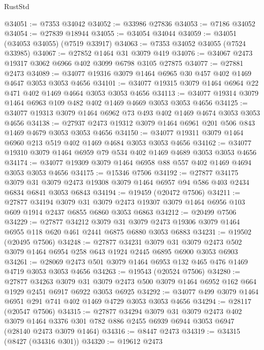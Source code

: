 \begin{lexlean}{RustStd}
\begin{coremodule}
@34051 := @7353 @34042
@34052 := @33986 @27836
@34053 := @7186 @34052
@34054 := @27839 @18944
@34055 := @34054 @34044
@34059 := @34051 (@34053 @34055) (@7519 @33917)
@34063 := @7353 @34052 @34055 (@7524 @33985)
@34067 := @27852 @1464 @31 @3079 @419
@34076 := @34067 @2473 @19317 @3062 @6966 @402 @3099 @6798 @3105 @27875
@34077 := @27881 @2473
@34089 := @34077 @19316 @3079 @1464 @6965 @30 @457 @402 @1469 @4647 @3053 @3053 @4656
@34101 := @34077 @19315 @3079 @1464 @6964 @22 @471 @402 @1469 @4664 @3053 @3053 @4656
@34113 := @34077 @19314 @3079 @1464 @6963 @109 @482 @402 @1469 @4669 @3053 @3053 @4656
@34125 := @34077 @19313 @3079 @1464 @6962 @73 @493 @402 @1469 @4674 @3053 @3053 @4656
@34138 := @27937 @2473 @19312 @3079 @1464 @6961 @201 @506 @843 @1469 @4679 @3053 @3053 @4656
@34150 := @34077 @19311 @3079 @1464 @6960 @213 @519 @402 @1469 @4684 @3053 @3053 @4656
@34162 := @34077 @19310 @3079 @1464 @6959 @79 @534 @402 @1469 @4689 @3053 @3053 @4656
@34174 := @34077 @19309 @3079 @1464 @6958 @88 @557 @402 @1469 @4694 @3053 @3053 @4656
@34175 := @15346 @7506
@34192 := @27877
    @34175
    @3079
    @31
    @3079
    @2473
    @19308
    @3079
    @1464
    @6957
    @94
    @586
    @403
    @2434
    @6834
    @6841
    @3053
    @6843
@34194 := @19459 (@20472 @7506)
@34211 := @27877
    @34194
    @3079
    @31
    @3079
    @2473
    @19307
    @3079
    @1464
    @6956
    @103
    @609
    @1914
    @2437
    @6855
    @6860
    @3053
    @6863
@34212 := @20499 @7506
@34229 := @27877
    @34212
    @3079
    @31
    @3079
    @2473
    @19306
    @3079
    @1464
    @6955
    @118
    @620
    @461
    @2441
    @6875
    @6880
    @3053
    @6883
@34231 := @19502 (@20495 @7506)
@34248 := @27877
    @34231
    @3079
    @31
    @3079
    @2473
    @502
    @3079
    @1464
    @6954
    @258
    @643
    @1924
    @2445
    @6895
    @6900
    @3053
    @6903
@34261 := @28069 @2473 @501 @3079 @1464 @6953 @132 @465 @476 @1469 @4719 @3053 @3053 @4656
@34263 := @19543 (@20524 @7506)
@34280 := @27877
    @34263
    @3079
    @31
    @3079
    @2473
    @500
    @3079
    @1464
    @6952
    @162
    @664
    @1929
    @2451
    @6917
    @6922
    @3053
    @6925
@34292 := @34077 @499 @3079 @1464 @6951 @291 @741 @402 @1469 @4729 @3053 @3053 @4656
@34294 := @28117 (@20547 @7506)
@34315 := @27877
    @34294
    @3079
    @31
    @3079
    @2473
    @402
    @3079
    @1464
    @3376
    @301
    @782
    @886
    @2455
    @6939
    @6944
    @3053
    @6947
    (@28140 @2473 @3079 @1464)
@34316 := @8447 @2473
@34319 := @34315 (@8427 (@34316 @301))
@34320 := @19612 @2473

\end{coremodule}
\end{lexlean}

